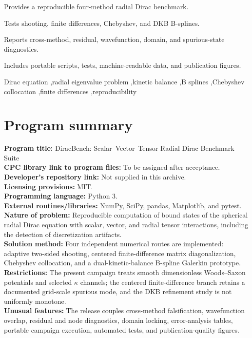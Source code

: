 \documentclass[a4paper,fleqn]{cas-dc}
\begin{document}
\begin{highlights}
\item Provides a reproducible four-method radial Dirac benchmark.
\item Tests shooting, finite differences, Chebyshev, and DKB B-splines.
\item Reports cross-method, residual, wavefunction, domain, and spurious-state diagnostics.
\item Includes portable scripts, tests, machine-readable data, and publication figures.
\end{highlights}

\begin{keywords}
Dirac equation \sep radial eigenvalue problem \sep kinetic balance \sep B splines \sep Chebyshev collocation \sep finite differences \sep reproducibility
\end{keywords}

\maketitle
\linenumbers

\section*{Program summary}
\noindent\textbf{Program title:} DiracBench: Scalar--Vector--Tensor Radial Dirac Benchmark Suite\\
\textbf{CPC library link to program files:} To be assigned after acceptance.\\
\textbf{Developer's repository link:} Not supplied in this archive.\\
\textbf{Licensing provisions:} MIT.\\
\textbf{Programming language:} Python 3.\\
\textbf{External routines/libraries:} NumPy, SciPy, pandas, Matplotlib, and pytest.\\
\textbf{Nature of problem:} Reproducible computation of bound states of the spherical radial Dirac equation with scalar, vector, and radial tensor interactions, including the detection of discretization artifacts.\\
\textbf{Solution method:} Four independent numerical routes are implemented: adaptive two-sided shooting, centered finite-difference matrix diagonalization, Chebyshev collocation, and a dual-kinetic-balance B-spline Galerkin prototype.\\
\textbf{Restrictions:} The present campaign treats smooth dimensionless Woods--Saxon potentials and selected $\kappa$ channels; the centered finite-difference branch retains a documented grid-scale spurious mode, and the DKB refinement study is not uniformly monotone.\\
\textbf{Unusual features:} The release couples cross-method falsification, wavefunction overlap, residual and node diagnostics, domain locking, error-analysis tables, portable campaign execution, automated tests, and publication-quality figures.
\end{document}
